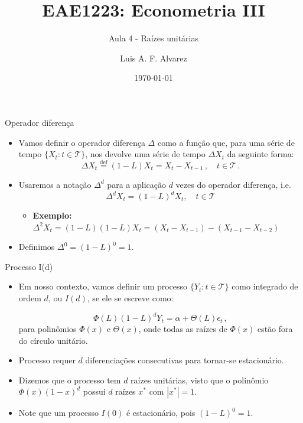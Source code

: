 \documentclass[11pt]{beamer}
\author{Luis A. F. Alvarez}
\title{EAE1223: Econometria III}
\subtitle{Aula 4 - Raízes unitárias}
\date{\today}
\begin{document}
\begin{frame}[plain]
	\maketitle
\end{frame}
\begin{frame}{Operador diferença}
	\begin{itemize}
		\item Vamos definir o operador diferença $\Delta$ como a função que, para uma série de tempo $\{X_t : t \in \mathcal{T}\}$, nos devolve uma série de tempo $\Delta X_t$ da seguinte forma:
		$$\Delta X_t \overset{\operatorname{def}}{=} (1-L)X_t = X_t - X_{t-1}\,, \quad t \in \mathcal{T}\, .$$
		\item Usaremos a notação $\Delta^d$ para a aplicação $d$ vezes do operador diferença, i.e.
		$$\Delta^d X_t = (1-L)^d X_t , \quad  t \in \mathcal{T}$$
		\begin{itemize}
			\item \textbf{Exemplo:} $\Delta^2 X_t = (1-L)(1-L)X_t = (X_t - X_{t-1}) - (X_{t-1} - X_{t-2})$
		\end{itemize}
		\vspace{1em}
		\item Definimos $\Delta^0 =(1-L)^0 = 1$.
	\end{itemize}
\end{frame}
\begin{frame}{Processo I(d)}
	\begin{itemize}
		\item Em nosso contexto, vamos definir um processo $\{Y_t:t \in \mathcal{T}\}$ {\color{blue}como integrado de ordem $d$, ou $I(d)$}, se ele se escreve como:
		
		$$\Phi(L)(1-L)^dY_t = \alpha + \Theta(L) \epsilon_t \, ,$$
		para polinômios $\Phi(x)$ e $\Theta(x)$, onde todas as raízes de $\Phi(x)$ estão fora do círculo unitário.
		\item Processo requer $d$ diferenciações consecutivas para tornar-se estacionário.
		\item Dizemos que o processo tem $d$ raízes unitárias, visto que o polinômio $\Phi(x)(1-x)^d$ possui $d$ raízes $x^*$ com $|x^*|=1$.
		\item Note que um processo $I(0)$ é estacionário, pois $(1-L)^0=1$.
	\end{itemize}
\end{frame}
\end{document}
